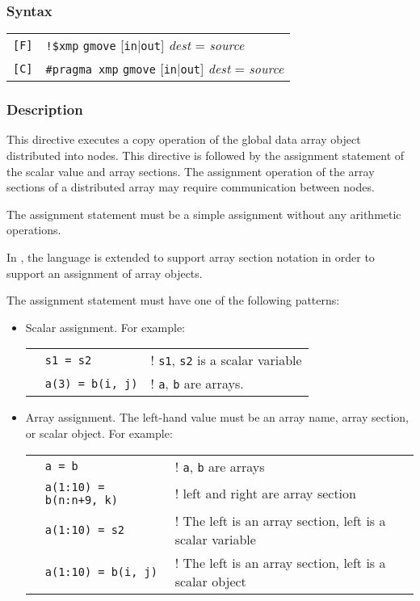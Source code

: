 \subsubsection*{Syntax}

\begin{tabular}{ll}
\verb![F]! & \verb|!$xmp| {\tt gmove} [{\tt in}$\vert${\tt out}] {\it dest}
= {\it source} \\
\verb![C]! & \verb|#pragma xmp| {\tt gmove} [{\tt in}$\vert${\tt out}] {\it
  dest} = {\it source} \\
\end{tabular}

\subsubsection*{Description}

This directive executes a copy operation of the global data array object
distributed into nodes. This directive is followed by the assignment
statement of the scalar value and array sections. The assignment operation
of the array sections of a distributed array may require communication
between nodes.

The assignment statement must be a simple assignment without
any arithmetic operations.   

In \XMP, the \C language is extended to support array section notation in order to
support an assignment of array objects.

The assignment statement must have one of the following patterns:

\begin{itemize}
\item  Scalar assignment. For example:

\begin{tabular}{lll}
\hspace{0.5cm} & {\tt s1 = s2} & ! {\tt s1}, {\tt s2} is a scalar
variable \\ 
& {\tt a(3) = b(i, j)} & ! {\tt a}, {\tt b} are arrays. \\
\end{tabular}

\item Array assignment. The left-hand value must be an array name,
array section, or scalar object. For example:

\begin{tabular}{lll}
\hspace{0.5cm} & {\tt a = b} & ! {\tt a}, {\tt b} are arrays \\
 & {\tt a(1:10) = b(n:n+9, k)} & ! left and right are array section \\
 & {\tt a(1:10) = s2} & ! The left is an array section, left is a
 scalar variable \\
 & {\tt a(1:10) = b(i, j)} & ! The left is an array section, left is a
 scalar object \\
\end{tabular}
\end{itemize}

